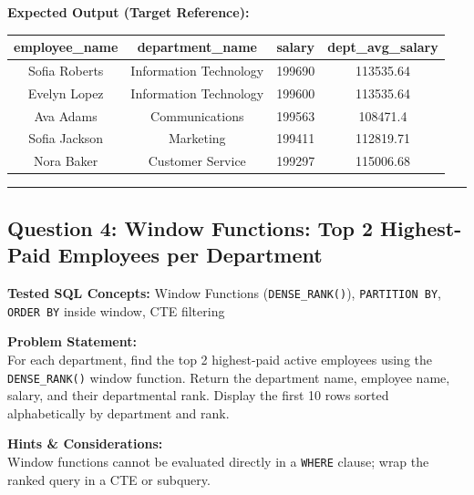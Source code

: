 \documentclass[11pt,a4paper]{article}
\begin{document}
\vspace{0.3cm}
\noindent\textbf{Expected Output (Target Reference):}
\begin{center}
\small
\begin{tabular}{cccc}
\toprule
\textbf{employee\_name} & \textbf{department\_name} & \textbf{salary} & \textbf{dept\_avg\_salary} \\
\midrule
Sofia Roberts & Information Technology & 199690 & 113535.64 \\
Evelyn Lopez & Information Technology & 199600 & 113535.64 \\
Ava Adams & Communications & 199563 & 108471.4 \\
Sofia Jackson & Marketing & 199411 & 112819.71 \\
Nora Baker & Customer Service & 199297 & 115006.68 \\
\bottomrule
\end{tabular}
\end{center}

\vspace{0.4cm}
\noindent\rule{\textwidth}{0.4pt}
\vspace{0.4cm}

\subsection*{Question 4: Window Functions: Top 2 Highest-Paid Employees per Department}

\noindent\textbf{Tested SQL Concepts:} Window Functions (\texttt{DENSE\_RANK()}), \texttt{PARTITION BY}, \texttt{ORDER BY} inside window, CTE filtering

\vspace{0.15cm}
\noindent\textbf{Problem Statement:} \\
For each department, find the top 2 highest-paid active employees using the \texttt{DENSE\_RANK()} window function. Return the department name, employee name, salary, and their departmental rank. Display the first 10 rows sorted alphabetically by department and rank.

\vspace{0.2cm}
\noindent\textbf{Hints \& Considerations:} \\
Window functions cannot be evaluated directly in a \texttt{WHERE} clause; wrap the ranked query in a CTE or subquery.
\end{document}
